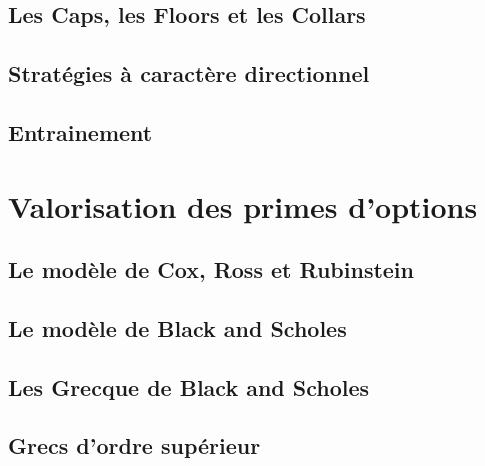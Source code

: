 \documentclass[a4paper, 12pt]{report}
\begin{document}
\subsection{Les Caps, les Floors et les Collars}

\subsection{Stratégies à caractère directionnel}

\subsection{Entrainement}

\section{Valorisation des primes d'options}

\subsection{Le modèle de Cox, Ross et Rubinstein}

\subsection{Le modèle de Black and Scholes}

\subsection{Les Grecque de Black and Scholes}

\subsection{Grecs d'ordre supérieur}
\end{document}
